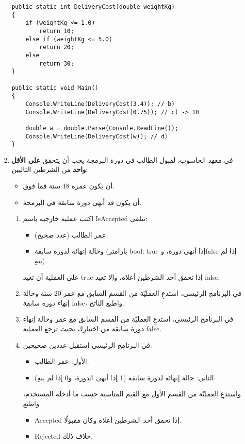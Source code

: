 \documentclass[14pt]{extarticle}
\begin{document}
\begin{enumerate}[itemsep=3em]
\ifwithsols
\begin{boxSolution}
\begin{english}
\begin{verbatim}
public static int DeliveryCost(double weightKg)
{
    if (weightKg <= 1.0)
        return 10;
    else if (weightKg <= 5.0)
        return 20;
    else
        return 30;
}

public static void Main()
{
    Console.WriteLine(DeliveryCost(3.4)); // b)
    Console.WriteLine(DeliveryCost(0.75)); // c) -> 10

    double w = double.Parse(Console.ReadLine());
    Console.WriteLine(DeliveryCost(w)); // d)
}
\end{verbatim}
\end{english}
\end{boxSolution}
\fi

\clearpage
\item
في معهد الحاسوب، لقبول الطالب في دورة البرمجة يجب أن يتحقق \textbf{على الأقل واحد} من الشرطين التاليين:
\begin{itemize}
  \item أن يكون عمره 18 سنة فما فوق.
  \item أن يكون قد أنهى دورة سابقة في البرمجة.
\end{itemize}

\begin{enumerate}
\item اكتب عملية خارجية باسم \textenglish{IsAccepted} تتلقى:
\begin{itemize}
  \item عمر الطالب (عدد صحيح).
  \item وحالة إنهائه لدورة سابقة (بارامتر \textenglish{bool}: \textenglish{true} إذا أنهى دورة، و\textenglish{false} إذا لم ينهِ).
\end{itemize}
على العملية أن تعيد \textenglish{true} إذا تحقق أحد الشرطين أعلاه، وإلا تعيد \textenglish{false}.
\item في البرنامج الرئيسي، استدعِ العمليّة من القسم السابق مع عمر 20 سنة وحالة إنهاء دورة سابقة \textenglish{false}، واطبع الناتج.
\item في البرنامج الرئيسي، استدعِ العمليّة من القسم السابق مع عمر وحالة إنهاء دورة سابقة من اختيارك بحيث ترجع العملية \textenglish{false}.
\item في البرنامج الرئيسي استقبل عددين صحيحين:
  \begin{itemize}
    \item الأول: عمر الطالب.
    \item الثاني: حالة إنهائه لدورة سابقة (1 إذا أنهى الدورة، و0 إذا لم ينهِ).
  \end{itemize}
واستدعِ العمليّة من القسم الأول مع القيم المناسبة حسب ما أدخله المستخدم، واطبع
    \begin{itemize}
      \item \textenglish{Accepted} إذا تحقق أحد الشرطين أعلاه وكان مقبولًا.
      \item \textenglish{Rejected} خلاف ذلك.
    \end{itemize}
\end{enumerate}


\end{enumerate}
\end{document}
